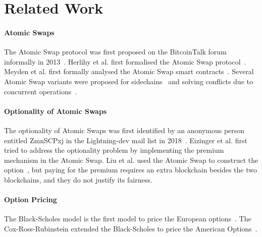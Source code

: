 \section{Related Work}
\label{sec:related_work}

\paragraph{Atomic Swaps}
The Atomic Swap protocol was first proposed on the BitcoinTalk forum informally in 2013~\cite{nolan2013alt}.
Herlihy et al. first formalised the Atomic Swap protocol~\cite{herlihy2018atomic}.
Meyden et al. first formally analysed the Atomic Swap smart contracts~\cite{van2018specification}.
Several Atomic Swap variants were proposed for sidechains~\cite{robinson2019atomic} and solving conflicts due to concurrent operations~\cite{zakhary2019atomic}.

\paragraph{Optionality of Atomic Swaps}
The optionality of Atomic Swaps was first identified by an anonymous person entitled ZmnSCPxj in the Lightning-dev mail list in 2018~\cite{optionality-origin}.
Eizinger et al. first tried to address the optionality problem by implementing the premium mechanism in the Atomic Swap\cite{first-attempt-optionality}.
Liu et al. used the Atomic Swap to construct the option~\cite{liu2018atomic}, but paying for the premium requires an extra blockchain besides the two blockchains, and they do not justify its fairness.

\paragraph{Option Pricing}
The Black-Scholes model is the first model to price the European options~\cite{black1973pricing}.
The Cox-Ross-Rubinstein extended the Black-Scholes to price the American Options~\cite{cox1979option}.
